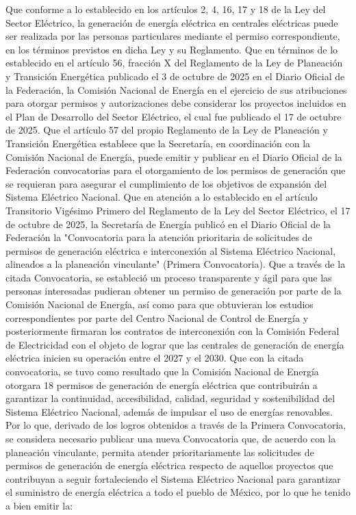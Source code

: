 Que conforme a lo establecido en los artículos 2, 4, 16, 17 y 18 de la Ley del Sector Eléctrico, la generación de energía eléctrica en centrales eléctricas puede ser realizada por las personas particulares mediante el permiso correspondiente, en los términos previstos en dicha Ley y su Reglamento.
Que en términos de lo establecido en el artículo 56, fracción X del Reglamento de la Ley de Planeación y Transición Energética publicado el 3 de octubre de 2025 en el Diario Oficial de la Federación, la Comisión Nacional de Energía en el ejercicio de sus atribuciones para otorgar permisos y autorizaciones debe considerar los proyectos incluidos en el Plan de Desarrollo del Sector Eléctrico, el cual fue publicado el 17 de octubre de 2025.
Que el artículo 57 del propio Reglamento de la Ley de Planeación y Transición Energética establece que la Secretaría, en coordinación con la Comisión Nacional de Energía, puede emitir y publicar en el Diario Oficial de la Federación convocatorias para el otorgamiento de los permisos de generación que se requieran para asegurar el cumplimiento de los objetivos de expansión del Sistema Eléctrico Nacional.
Que en atención a lo establecido en el artículo Transitorio Vigésimo Primero del Reglamento de la Ley del Sector Eléctrico, el 17 de octubre de 2025, la Secretaría de Energía publicó en el Diario Oficial de la Federación la "Convocatoria para la atención prioritaria de solicitudes de permisos de generación eléctrica e interconexión al Sistema Eléctrico Nacional, alineados a la planeación vinculante" (Primera Convocatoria).
Que a través de la citada Convocatoria, se estableció un proceso transparente y ágil para que las personas interesadas pudieran obtener un permiso de generación por parte de la Comisión Nacional de Energía, así como para que obtuvieran los estudios correspondientes por parte del Centro Nacional de Control de Energía y posteriormente firmaran los contratos de interconexión con la Comisión Federal de Electricidad con el objeto de lograr que las centrales de generación de energía eléctrica inicien su operación entre el 2027 y el 2030.
Que con la citada convocatoria, se tuvo como resultado que la Comisión Nacional de Energía otorgara 18 permisos de generación de energía eléctrica que contribuirán a garantizar la continuidad, accesibilidad, calidad, seguridad y sostenibilidad del Sistema Eléctrico Nacional, además de impulsar el uso de energías renovables.
Por lo que, derivado de los logros obtenidos a través de la Primera Convocatoria, se considera necesario publicar una nueva Convocatoria que, de acuerdo con la planeación vinculante, permita atender prioritariamente las solicitudes de permisos de generación de energía eléctrica respecto de aquellos proyectos que contribuyan a seguir fortaleciendo el Sistema Eléctrico Nacional para garantizar el suministro de energía eléctrica a todo el pueblo de México, por lo que he tenido a bien emitir la:
